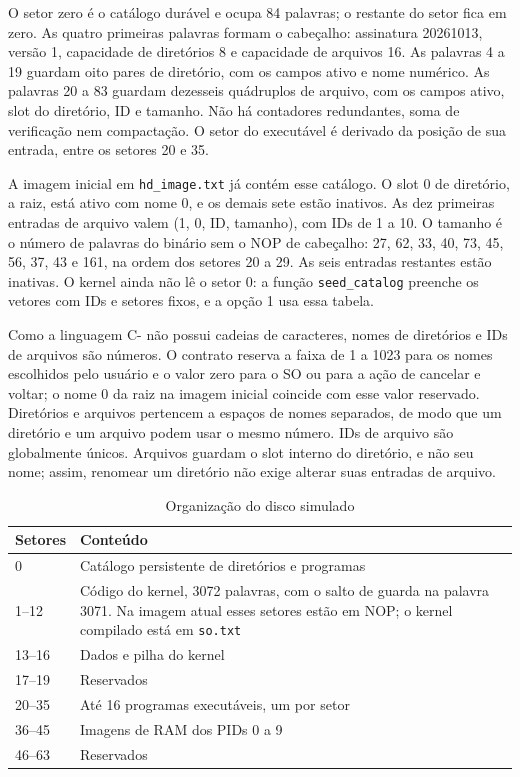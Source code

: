 \documentclass[
    12pt,
    openright,
    a4paper,
    english,
    brazilian
]{abntex2}
\begin{document}
O setor zero é o catálogo durável e ocupa 84 palavras; o restante do setor fica em zero. As quatro primeiras palavras formam o cabeçalho: assinatura 20261013, versão 1, capacidade de diretórios 8 e capacidade de arquivos 16. As palavras 4 a 19 guardam oito pares de diretório, com os campos ativo e nome numérico. As palavras 20 a 83 guardam dezesseis quádruplos de arquivo, com os campos ativo, slot do diretório, ID e tamanho. Não há contadores redundantes, soma de verificação nem compactação. O setor do executável é derivado da posição de sua entrada, entre os setores 20 e 35.

A imagem inicial em \texttt{hd\_image.txt} já contém esse catálogo. O slot 0 de diretório, a raiz, está ativo com nome 0, e os demais sete estão inativos. As dez primeiras entradas de arquivo valem (1, 0, ID, tamanho), com IDs de 1 a 10. O tamanho é o número de palavras do binário sem o NOP de cabeçalho: 27, 62, 33, 40, 73, 45, 56, 37, 43 e 161, na ordem dos setores 20 a 29. As seis entradas restantes estão inativas. O kernel ainda não lê o setor 0: a função \texttt{seed\_catalog} preenche os vetores com IDs e setores fixos, e a opção 1 usa essa tabela.

Como a linguagem C- não possui cadeias de caracteres, nomes de diretórios e IDs de arquivos são números. O contrato reserva a faixa de 1 a 1023 para os nomes escolhidos pelo usuário e o valor zero para o SO ou para a ação de cancelar e voltar; o nome 0 da raiz na imagem inicial coincide com esse valor reservado. Diretórios e arquivos pertencem a espaços de nomes separados, de modo que um diretório e um arquivo podem usar o mesmo número. IDs de arquivo são globalmente únicos. Arquivos guardam o slot interno do diretório, e não seu nome; assim, renomear um diretório não exige alterar suas entradas de arquivo.

\begin{table}[H]
\centering
\caption{Organização do disco simulado}
\label{tab:layout-disco}
\small
\begin{tabular}{p{3.2cm}p{9.2cm}}
\toprule
\textbf{Setores} & \textbf{Conteúdo} \\
\midrule
0 & Catálogo persistente de diretórios e programas \\
1--12 & Código do kernel, 3072 palavras, com o salto de guarda na palavra 3071. Na imagem atual esses setores estão em NOP; o kernel compilado está em \texttt{so.txt} \\
13--16 & Dados e pilha do kernel \\
17--19 & Reservados \\
20--35 & Até 16 programas executáveis, um por setor \\
36--45 & Imagens de RAM dos PIDs 0 a 9 \\
46--63 & Reservados \\
\bottomrule
\end{tabular}
\end{table}
\end{document}
